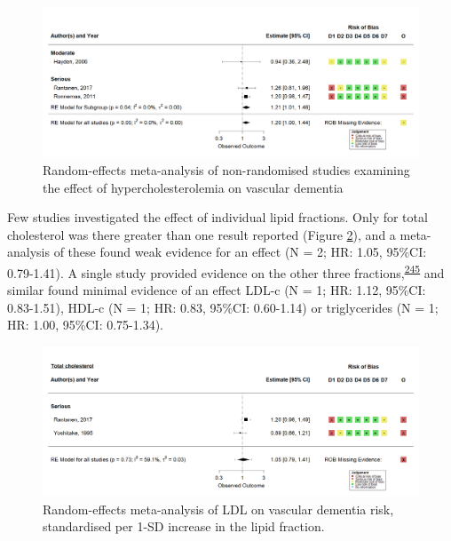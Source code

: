 \documentclass[a4paper, twoside]{templates/ociamthesis}
\begin{document}
\begin{figure}[H]
\includegraphics[width=1\linewidth]{figures/sys-rev/fp_obs_hyperchol_VaD} \caption[Meta-analysis of hypercholesterolemia on vascular dementia]{Random-effects meta-analysis of non-randomised studies examining the effect of hypercholesterolemia on vascular dementia}\label{fig:obsHyperVaD}
\end{figure}

Few studies investigated the effect of individual lipid fractions. Only for total cholesterol was there greater than one result reported (Figure \ref{fig:lipidFractionsVaD}), and a meta-analysis of these found weak evidence for an effect (N = 2; HR: 1.05, 95\%CI: 0.79-1.41). A single study provided evidence on the other three fractions,\textsuperscript{\protect\hyperlink{ref-yoshitake1995}{245}} and similar found minimal evidence of an effect LDL-c (N = 1; HR: 1.12, 95\%CI: 0.83-1.51), HDL-c (N = 1; HR: 0.83, 95\%CI: 0.60-1.14) or triglycerides (N = 1; HR: 1.00, 95\%CI: 0.75-1.34).





\begin{figure}[H]
\includegraphics[width=1\linewidth]{figures/sys-rev/fp_obs_VaD_TC_} \caption[Random-effects meta-analysis of four lipid fractions on Alzheimer's disease]{Random-effects meta-analysis of LDL on vascular dementia risk, standardised per 1-SD increase in the lipid fraction.}\label{fig:lipidFractionsVaD}
\end{figure}
\end{document}
